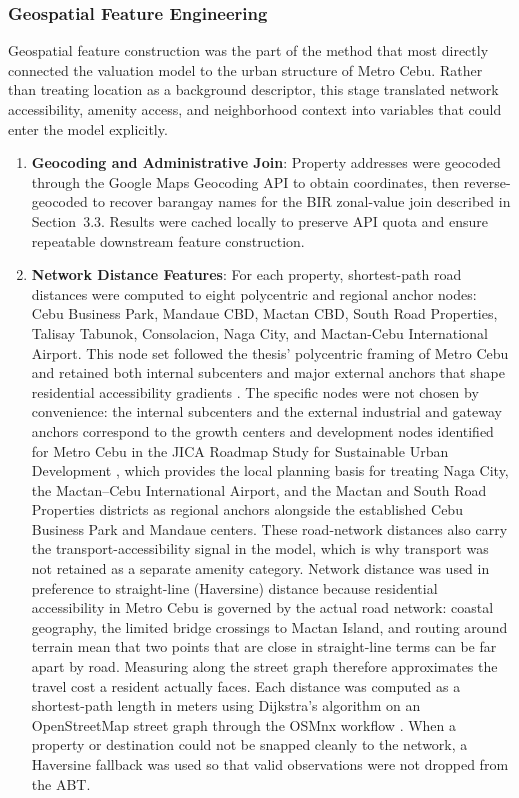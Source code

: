 \subsubsection{Geospatial Feature Engineering}\label{geospatial-feature-engineering}

Geospatial feature construction was the part of the method that most directly connected the valuation model to the urban structure of Metro Cebu. Rather than treating location as a background descriptor, this stage translated network accessibility, amenity access, and neighborhood context into variables that could enter the model explicitly.

\begin{enumerate}
\item \textbf{Geocoding and Administrative Join}: Property addresses were geocoded through the Google Maps Geocoding API to obtain coordinates, then reverse-geocoded to recover barangay names for the BIR zonal-value join described in Section~3.3. Results were cached locally to preserve API quota and ensure repeatable downstream feature construction.

\item \textbf{Network Distance Features}: For each property, shortest-path road distances were computed to eight polycentric and regional anchor nodes: Cebu Business Park, Mandaue CBD, Mactan CBD, South Road Properties, Talisay Tabunok, Consolacion, Naga City, and Mactan-Cebu International Airport. This node set followed the thesis' polycentric framing of Metro Cebu and retained both internal subcenters and major external anchors that shape residential accessibility gradients \parencite{giuliano1991subcenters}. The specific nodes were not chosen by convenience: the internal subcenters and the external industrial and gateway anchors correspond to the growth centers and development nodes identified for Metro Cebu in the JICA Roadmap Study for Sustainable Urban Development \parencite{jica2015metrocebu}, which provides the local planning basis for treating Naga City, the Mactan--Cebu International Airport, and the Mactan and South Road Properties districts as regional anchors alongside the established Cebu Business Park and Mandaue centers. These road-network distances also carry the transport-accessibility signal in the model, which is why transport was not retained as a separate amenity category. Network distance was used in preference to straight-line (Haversine) distance because residential accessibility in Metro Cebu is governed by the actual road network: coastal geography, the limited bridge crossings to Mactan Island, and routing around terrain mean that two points that are close in straight-line terms can be far apart by road. Measuring along the street graph therefore approximates the travel cost a resident actually faces. Each distance was computed as a shortest-path length in meters using Dijkstra's algorithm on an OpenStreetMap street graph through the OSMnx workflow \parencite{boeing2017osmnx,boeing2019urban}. When a property or destination could not be snapped cleanly to the network, a Haversine fallback was used so that valid observations were not dropped from the ABT.


\end{enumerate}
